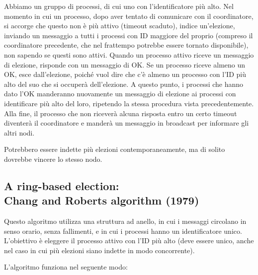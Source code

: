 Abbiamo un gruppo di processi, di cui uno con l'identificatore più alto. Nel momento in cui un processo, dopo aver tentato di comunicare con il coordinatore, si accorge che questo non è più attivo (timeout scaduto), indice un'elezione, inviando un messaggio a tutti i processi con ID maggiore del proprio (compreso il coordinatore precedente, che nel frattempo potrebbe essere tornato disponibile), non sapendo se questi sono attivi. Quando un processo attivo riceve un messaggio di elezione, risponde con un messaggio di OK. Se un processo riceve almeno un OK, esce dall'elezione, poiché vuol dire che c'è almeno un processo con l'ID più alto del suo che si occuperà dell'elezione. A questo punto, i processi che hanno dato l'OK manderanno nuovamente un messaggio di elezione ai processi con identificare più alto del loro, ripetendo la stessa procedura vista precedentemente. Alla fine, il processo che non riceverà alcuna risposta entro un certo timeout diventerà il coordinatore e manderà un messaggio in broadcast per informare gli altri nodi.

Potrebbero essere indette più elezioni contemporaneamente, ma di solito dovrebbe vincere lo stesso nodo.

\subsection{A ring-based election:\\ Chang and Roberts algorithm (1979)}

Questo algoritmo utilizza una struttura ad anello, in cui i messaggi circolano in senso orario, senza fallimenti, e in cui i processi hanno un identificatore unico. L'obiettivo è eleggere il processo attivo con l'ID più alto (deve essere unico, anche nel caso in cui più elezioni siano indette in modo concorrente).

L'algoritmo funziona nel seguente modo:

